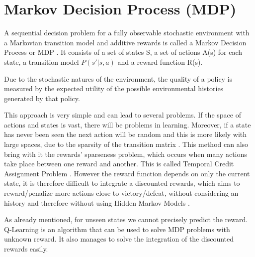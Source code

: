 \section{Markov Decision Process (MDP)}
\label{sec:mdp}
A sequential decision problem for a fully observable stochastic environment with a 
Markovian transition model and additive rewards is called a 
Markov Decision Process or MDP \cite{russell2002artificial}.
It consists of a set of states S, a set of actions A(s) for each state, a transition model
$P(s' | s, a)$ and a reward function R(s).

Due to the stochastic natures of the environment, the quality of a policy is measured by the expected utility of the possible environmental histories generated by that policy.

This approach is very simple and can lead to several problems.
If the space of actions and states is vast, there will be problems in learning.
Moreover, if a state has never been seen the next action will be random and this is more
likely with large spaces, due to the sparsity of the transition matrix \cite{silver2015}.
This method can also bring with it the rewards' sparseness problem, which occurs when many
actions take place between one reward and another. This is called Temporal Credit Assignment Problem \cite{sutton1984temporal}.
However the reward function depends on only the current state, it is
therefore difficult to integrate a discounted rewards, which aims to reward/penalize
more actions close to victory/defeat, without considering an history and therefore
without using Hidden Markov Models \cite{silver2015}.

As already mentioned, for unseen states we cannot precisely predict the reward.
Q-Learning is an algorithm that can be used to solve MDP problems with unknown reward.
It also manages to solve the integration of the discounted rewards easily.
